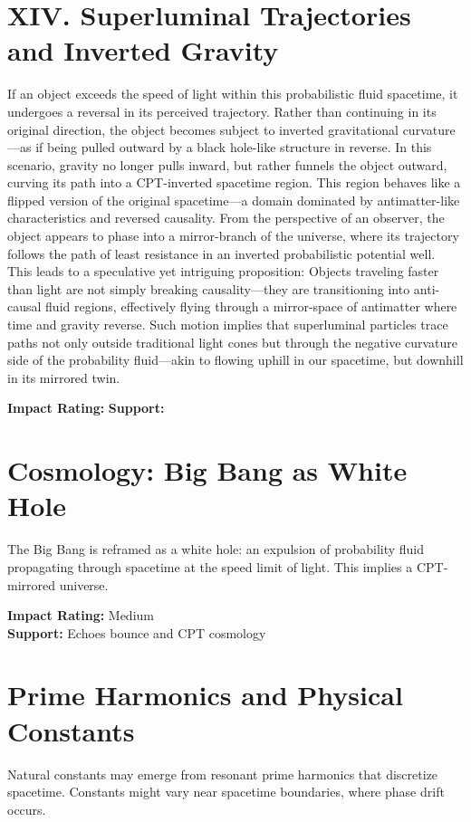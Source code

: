 \documentclass[12pt]{article}
\begin{document}
\section{XIV. Superluminal Trajectories and Inverted Gravity}
If an object exceeds the speed of light within this probabilistic fluid spacetime, it undergoes a reversal in its perceived trajectory. Rather than continuing in its original direction, the object becomes subject to inverted gravitational curvature—as if being pulled outward by a black hole-like structure in reverse.
In this scenario, gravity no longer pulls inward, but rather funnels the object outward, curving its path into a CPT-inverted spacetime region. This region behaves like a flipped version of the original spacetime—a domain dominated by antimatter-like characteristics and reversed causality.
From the perspective of an observer, the object appears to phase into a mirror-branch of the universe, where its trajectory follows the path of least resistance in an inverted probabilistic potential well.
This leads to a speculative yet intriguing proposition:
Objects traveling faster than light are not simply breaking causality—they are transitioning into anti-causal fluid regions, effectively flying through a mirror-space of antimatter where time and gravity reverse.
Such motion implies that superluminal particles trace paths not only outside traditional light cones but through the negative curvature side of the probability fluid—akin to flowing uphill in our spacetime, but downhill in its mirrored twin.

\textbf{Impact Rating:} 
\textbf{Support:} 

\section{Cosmology: Big Bang as White Hole}
The Big Bang is reframed as a white hole: an expulsion of probability fluid propagating through spacetime at the speed limit of light. This implies a CPT-mirrored universe.

\textbf{Impact Rating:} Medium\\
\textbf{Support:} Echoes bounce and CPT cosmology

\section{Prime Harmonics and Physical Constants}
Natural constants may emerge from resonant prime harmonics that discretize spacetime. Constants might vary near spacetime boundaries, where phase drift occurs.
\end{document}
